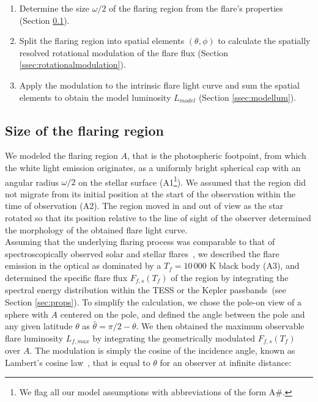 \documentclass[fleqn,usenatbib,letters]{mnras}%
\begin{document}
\begin{enumerate}
    \item Determine the size $\omega/2$ of the flaring region from the flare's properties (Section \ref{ssec:flaringregion}). %
    \item Split the flaring region into spatial elements $(\theta, \phi)$ to calculate the spatially resolved rotational modulation of the flare flux (Section \ref{ssec:rotationalmodulation}).
    \item Apply the modulation to the intrinsic flare light curve and sum the spatial elements to obtain the model luminosity $L_{model}$ (Section \ref{ssec:modellum}).
\end{enumerate}

\subsection{Size of the flaring region}
\label{ssec:flaringregion}
We modeled the flaring region $A$, that is the photospheric footpoint, from which the white light emission originates, as a uniformly bright spherical cap with an angular radius $\omega/2$ on the stellar surface (A1\footnote{We flag all our model assumptions with abbreviations of the form A\#.}). We assumed that the region did not migrate from its initial position at the start of the observation within the time of observation (A2). The region moved in and out of view as the star rotated so that its position relative to the line of sight of the observer determined the morphology of the obtained flare light curve.
\\
Assuming that the underlying flaring process was comparable to that of spectroscopically observed solar and stellar flares~\citep{hawley1992, kretzschmar2011}, we described the flare emission in the optical as dominated by a $T_f=10\,000$ K black body (A3), and determined the specific flare flux $F_{f,s}(T_f)$ of the region by integrating the spectral energy distribution within the TESS or the Kepler passbands~(see Section \ref{sec:props}). To simplify the calculation, we chose the pole-on view of a sphere with $A$ centered on the pole, and defined the angle between the pole and any given latitude $\theta$ as $\hat\theta=\pi/2 - \theta$. We then obtained the maximum observable flare luminosity $L_{f,max}$ by integrating the geometrically modulated $F_{f,s}(T_f)$ over $A$. The modulation is simply the cosine of the incidence angle, known as Lambert's cosine law~\citep{lambert1892}, that is equal to $\theta$ for an observer at infinite distance:
\end{document}
